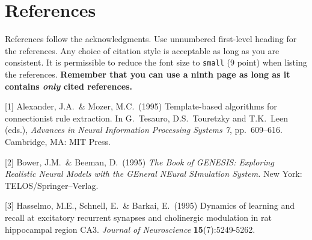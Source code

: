 \documentclass{article}
\begin{document}
\section*{References}

References follow the acknowledgments. Use unnumbered first-level
heading for the references. Any choice of citation style is acceptable
as long as you are consistent. It is permissible to reduce the font
size to \verb+small+ (9 point) when listing the references. {\bf
  Remember that you can use a ninth page as long as it contains
  \emph{only} cited references.}
\medskip

\small

[1] Alexander, J.A.\ \& Mozer, M.C.\ (1995) Template-based algorithms
for connectionist rule extraction. In G.\ Tesauro, D.S.\ Touretzky and
T.K.\ Leen (eds.), {\it Advances in Neural Information Processing
  Systems 7}, pp.\ 609--616. Cambridge, MA: MIT Press.

[2] Bower, J.M.\ \& Beeman, D.\ (1995) {\it The Book of GENESIS:
  Exploring Realistic Neural Models with the GEneral NEural SImulation
  System.}  New York: TELOS/Springer--Verlag.

[3] Hasselmo, M.E., Schnell, E.\ \& Barkai, E.\ (1995) Dynamics of
learning and recall at excitatory recurrent synapses and cholinergic
modulation in rat hippocampal region CA3. {\it Journal of
  Neuroscience} {\bf 15}(7):5249-5262.
\end{document}
